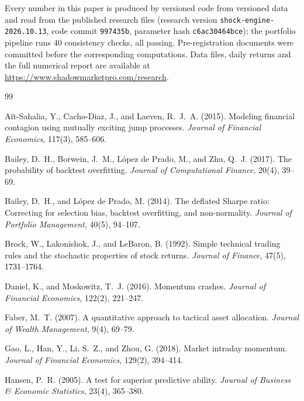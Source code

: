 \documentclass[11pt,a4paper]{article}
\newcommand{\1}{\mathbf{1}}
\begin{document}
Every number in this paper is produced by versioned code from versioned data and read from the published research files (research version \texttt{shock-engine-2026.10.13}, code commit \texttt{997435b}, parameter hash \texttt{c6ac30464bce}); the portfolio pipeline runs 40 consistency checks, all passing. Pre-registration documents were committed before the corresponding computations. Data files, daily returns and the full numerical report are available at \url{https://www.shadowmarketpro.com/research}.

\clearpage
\begin{thebibliography}{99}
\setlength{\itemsep}{2pt}\small

 A\"it-Sahalia, Y., Cacho-Diaz, J., and Laeven, R.~J.~A. (2015). Modeling financial contagion using mutually exciting jump processes. \emph{Journal of Financial Economics}, 117(3), 585--606.

 Bailey, D.~H., Borwein, J.~M., L\'opez de Prado, M., and Zhu, Q.~J. (2017). The probability of backtest overfitting. \emph{Journal of Computational Finance}, 20(4), 39--69.

 Bailey, D.~H., and L\'opez de Prado, M. (2014). The deflated Sharpe ratio: Correcting for selection bias, backtest overfitting, and non-normality. \emph{Journal of Portfolio Management}, 40(5), 94--107.

 Brock, W., Lakonishok, J., and LeBaron, B. (1992). Simple technical trading rules and the stochastic properties of stock returns. \emph{Journal of Finance}, 47(5), 1731--1764.

 Daniel, K., and Moskowitz, T.~J. (2016). Momentum crashes. \emph{Journal of Financial Economics}, 122(2), 221--247.

 Faber, M.~T. (2007). A quantitative approach to tactical asset allocation. \emph{Journal of Wealth Management}, 9(4), 69--79.

 Gao, L., Han, Y., Li, S.~Z., and Zhou, G. (2018). Market intraday momentum. \emph{Journal of Financial Economics}, 129(2), 394--414.

 Hansen, P.~R. (2005). A test for superior predictive ability. \emph{Journal of Business \& Economic Statistics}, 23(4), 365--380.


\end{thebibliography}
\end{document}
